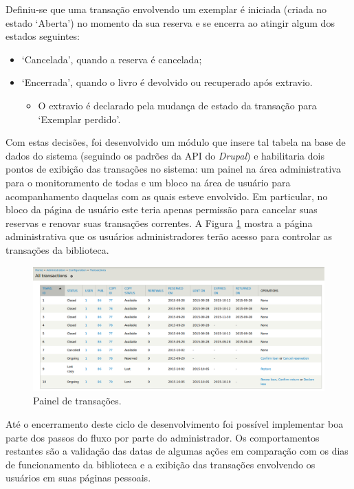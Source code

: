 \documentclass[a4paper]{article}
\begin{document}
Definiu-se que uma transação envolvendo um exemplar é iniciada (criada no estado ‘Aberta’) no momento da sua reserva e se encerra ao atingir algum dos estados seguintes:
\begin{itemize}
\item ‘Cancelada’, quando a reserva é cancelada;
\item ‘Encerrada’, quando o livro é devolvido ou recuperado após extravio.
\begin{itemize}
\item O extravio é declarado pela mudança de estado da transação para ‘Exemplar perdido’.
\end{itemize}
\end{itemize}

Com estas decisões, foi desenvolvido um módulo que insere tal tabela na base de dados do sistema (seguindo os padrões da API do \textit{Drupal}) e habilitaria dois pontos de exibição das transações no sistema: um painel na área administrativa para o monitoramento de todas e um bloco na área de usuário para acompanhamento daquelas com as quais esteve envolvido. Em particular, no bloco da página de usuário este teria apenas permissão para cancelar suas reservas e renovar suas transações correntes. A Figura \ref{transactions} mostra a página administrativa que os usuários administradores terão acesso para controlar as transações da biblioteca.

\begin{figure}[pbth!]
\centering
\includegraphics[width=140mm, trim={35mm 0 30mm 20mm}, clip]{img/transactions.png}
\caption{Painel de transações.\label{transactions}}
\end{figure}

Até o encerramento deste ciclo de desenvolvimento foi possível implementar boa parte dos passos do fluxo por parte do administrador. Os comportamentos restantes são a validação das datas de algumas ações em comparação com os dias de funcionamento da biblioteca e a exibição das transações envolvendo os usuários em suas páginas pessoais.
\end{document}
